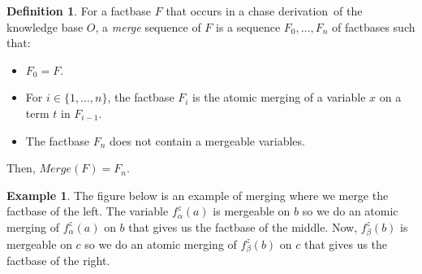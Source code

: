 \documentclass{article}
\theoremstyle{definition}
\newtheorem{definition}{Definition}[section]
\newtheorem{example}{Example}[section]
\theoremstyle{remark}
\newcommand{\Merge}{\textit{Merge}}
\begin{document}
\begin{definition}
For a factbase $F$ that occurs in a chase derivation\ of the knowledge base $O$, a \emph{merge} sequence of $F$ is a sequence $F_0,\ldots,F_n$ of factbases such that:
\begin{itemize}
\item $F_0 = F$.
\item For $i \in \{1,\ldots,n\}$, the factbase $F_i$ is the atomic merging of a variable $x$ on a term $t$ in $F_{i-1}$.
\item The factbase $F_n$ does not contain a mergeable variables.
\end{itemize}
Then, $\Merge(F) = F_n$. 
\end{definition}

\begin{example} 
The figure below is an example of merging where we merge the factbase of the left. The variable $f_\alpha^z(a)$ is mergeable on $b$ so we do an atomic merging of $f_\alpha^z(a)$ on $b$ that gives us the factbase of the middle. Now, $f_\beta^z(b)$ is mergeable on $c$ so we do an atomic merging of $f_\beta^z(b)$ on $c$ that gives us the factbase of the right.


\end{example}
\end{document}
